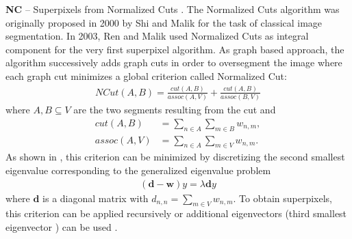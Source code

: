 \textbf{NC} -- Superpixels from Normalized Cuts \cite{RenMalik:2003}. The Normalized Cuts algorithm was originally proposed in 2000 by Shi and Malik \cite{ShiMalik:2000} for the task of classical image segmentation. In 2003, Ren and Malik \cite{RenMalik:2003} used Normalized Cuts as integral component for the very first superpixel algorithm. As graph based approach, the algorithm successively adds graph cuts in order to oversegment the image where each graph cut minimizes a global criterion called Normalized Cut:
\begin{align}
	NCut(A,B) = \frac{cut(A,B)}{assoc(A,V)} + \frac{cut(A,B)}{assoc(B,V)}
\end{align}
where $A,B \subseteq V$ are the two segments resulting from the cut and
\begin{align}
	cut(A,B) &= \sum_{n \in A} \sum_{m \in B} w_{n,m},\\
	assoc(A, V) &= \sum_{n \in A} \sum_{m \in V} w_{n,m}.
\end{align}
As shown in \cite{ShiMalik:2000}, this criterion can be minimized by discretizing the second smallest eigenvalue corresponding to the generalized eigenvalue problem
\begin{align}
	(\boldsymbol{d} - \boldsymbol{w})y = \lambda \boldsymbol{d} y
\end{align}
where $\boldsymbol{d}$ is a diagonal matrix with $d_{n,n} = \sum_{m \in V} w_{n,m}$. To obtain superpixels, this criterion can be applied recursively or additional eigenvectors (third smallest eigenvector \etc) can be used \cite{RenMalik:2003}.

